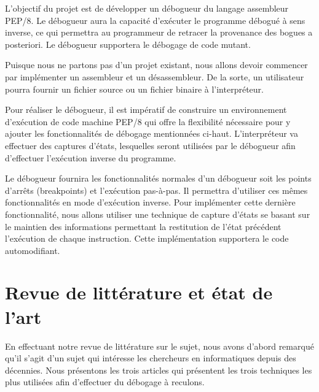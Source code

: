 \documentclass{article}
\begin{document}
L'objectif du projet est de développer un débogueur du langage
assembleur PEP/8. Le débogueur aura la capacité d'exécuter le programme
débogué à sens inverse, ce qui permettra au programmeur de retracer la
provenance des bogues a posteriori. Le débogueur supportera le débogage
de code mutant.

Puisque nous ne partons pas d'un projet existant, nous allons devoir
commencer par implémenter un assembleur et un désassembleur. De la
sorte, un utilisateur pourra fournir un fichier source ou un fichier
binaire à l'interpréteur.

Pour réaliser le débogueur, il est impératif de construire un
environnement d'exécution de code machine PEP/8 qui offre la flexibilité
nécessaire pour y ajouter les fonctionnalités de débogage mentionnées
ci-haut. L'interpréteur va effectuer des captures d'états,
lesquelles seront utilisées par le débogueur afin d'effectuer
l'exécution inverse du programme.

Le débogueur fournira les fonctionnalités normales d'un débogueur soit
les points d'arrêts (breakpoints) et l'exécution pas-à-pas. Il permettra
d'utiliser ces mêmes fonctionnalités en mode d'exécution inverse. Pour
implémenter cette dernière fonctionnalité, nous allons utiliser une
technique de capture d'états se basant sur le maintien des informations
permettant la restitution de l'état précédent l'exécution de chaque
instruction. Cette implémentation supportera le code automodifiant.

\section{Revue de littérature et état de
l'art}\label{revue-de-littuxe9rature-et-uxe9tat-de-lart}

En effectuant notre revue de littérature sur le sujet, nous avons
d'abord remarqué qu'il s'agit d'un sujet qui intéresse les chercheurs en
informatiques depuis des décennies. Nous présentons les trois articles
qui présentent les trois techniques les plus utilisées afin d'effectuer
du débogage à reculons.
\end{document}
